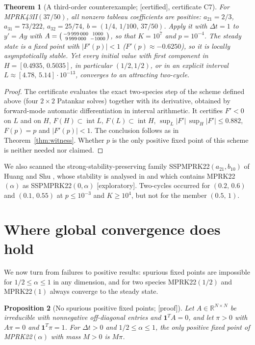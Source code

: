 \documentclass[11pt,a4paper]{article}
\theoremstyle{plain}
\newtheorem{theorem}{Theorem}
\newtheorem{proposition}[theorem]{Proposition}
\theoremstyle{definition}
\newcommand{\R}{\mathbb R}
\newcommand{\status}[1]{\textsf{[#1]}}
\begin{document}
\begin{theorem}[A third-order counterexample; \status{certified}, certificate C7]\label{thm:mprk43}
For MPRK43II$(37/50)$, all nonzero tableau coefficients are positive: $a_{21}=2/3$, $a_{31}=73/222$, $a_{32}=25/74$, $b=(1/4,\,1/100,\,37/50)$. Apply it with $\Delta t=1$ to $y'=Ay$ with $A=\begin{psmallmatrix}-9\,999\,000&1000\\9\,999\,000&-1000\end{psmallmatrix}$, so that $K=10^7$ and $p=10^{-4}$. The steady state is a fixed point with $|F'(p)|<1$ ($F'(p)\approx-0.6250$), so it is locally asymptotically stable. Yet every initial value with first component in $H=[0.4935,\,0.5035]$, in particular $(1/2,1/2)$, or in an explicit interval $L\approx[4.78,\,5.14]\cdot10^{-13}$, converges to an attracting two-cycle.
\end{theorem}

\begin{proof}
The certificate evaluates the exact two-species step of the scheme defined above (four $2\times2$ Patankar solves) together with its derivative, obtained by forward-mode automatic differentiation in interval arithmetic. It certifies $F'<0$ on $L$ and on $H$, $F(H)\subset\operatorname{int}L$, $F(L)\subset\operatorname{int}H$, $\sup_L|F'|\,\sup_H|F'|\le0.882$, $F(p)=p$ and $|F'(p)|<1$. The conclusion follows as in Theorem~\ref{thm:witness}. Whether $p$ is the only positive fixed point of this scheme is neither needed nor claimed.
\end{proof}

We also scanned the strong-stability-preserving family SSPMPRK22$(a_{21},b_{10})$ of Huang and Shu \cite{HS2019}, whose stability is analysed in \cite{HIKMS2023} and which contains MPRK22$(\alpha)$ as SSPMPRK22$(0,\alpha)$ \status{exploratory}. Two-cycles occurred for $(0.2,\,0.6)$ and $(0.1,\,0.55)$ at $p\le10^{-3}$ and $K\ge10^4$, but not for the member $(0.5,\,1)$.

\section{Where global convergence does hold}\label{sec:positive}

We now turn from failures to positive results: spurious fixed points are impossible for $1/2\le\alpha\le1$ in any dimension, and for two species MPRK22$(1/2)$ and MPRK22$(1)$ always converge to the steady state.

\begin{proposition}[No spurious positive fixed points; \status{proof}]\label{prop:alln}
Let $A\in\R^{N\times N}$ be irreducible with nonnegative off-diagonal entries and $\mathbf 1^TA=0$, and let $\pi>0$ with $A\pi=0$ and $\mathbf 1^T\pi=1$. For $\Delta t>0$ and $1/2\le\alpha\le1$, the only positive fixed point of MPRK22$(\alpha)$ with mass $M>0$ is $M\pi$.
\end{proposition}
\end{document}
